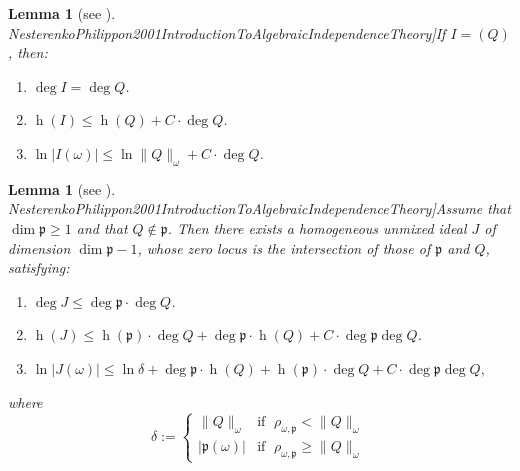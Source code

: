 \documentclass[reqno]{amsart}
\newcommand{\mycite}[2]{\cite[#1]{#2}}
\theoremstyle{plain}
\newtheorem{Lem}[Cor]{Lemma}
\theoremstyle{definition}
\theoremstyle{remark}
\theoremstyle{plain}
\begin{document}
\begin{Lem}[see \mycite{Chapter 3, Proposition 4.8}{NesterenkoPhilippon2001IntroductionToAlgebraicIndependenceTheory}]\label{Lemma Nesterenko principal ideal}
If $I=(Q)$, then:
\begin{enumerate}
 \item $\deg I=\deg Q$.
 \item $\operatorname{h}(I)\leq\operatorname{h}(Q)+C\cdot\deg Q$.
 \item $\ln|I(\omega)|\leq\ln\|Q\|_\omega+C\cdot\deg Q$.
\end{enumerate}
\end{Lem}

\begin{Lem}[see \mycite{Chapter 3, Proposition 4.11}{NesterenkoPhilippon2001IntroductionToAlgebraicIndependenceTheory}]\label{Lemma Nesterenko proposition intersection of ideal and polynomial}
Assume that $\dim\mathfrak p\geq 1$ and that $Q\not\in\mathfrak p$. Then there exists a homogeneous unmixed ideal $J$ of dimension $\dim\mathfrak p -1$, whose zero locus is the intersection of those of $\mathfrak p$ and $Q$, satisfying:
\begin{enumerate}
\item $\deg J\leq \deg\mathfrak p\cdot\deg Q$.
\item $\operatorname{h}(J)\leq\operatorname{h}(\mathfrak p)\cdot\deg Q+\deg\mathfrak p\cdot\operatorname{h}(Q)+C\cdot\deg\mathfrak p\deg Q$.
\item $
    \ln|J(\omega)|
        \leq
    \ln\delta+\deg\mathfrak p\cdot\operatorname{h}(Q)+\operatorname{h}(\mathfrak p)\cdot\deg Q+C\cdot\deg\mathfrak p\deg Q
,$
\end{enumerate}

where
\[
    \delta
        :=
\begin{cases}
    \|Q\|_\omega&\text{if }\;\rho_{\omega,\mathfrak p}<\|Q\|_\omega\\
    |\mathfrak p(\omega)|&\text{if }\;\rho_{\omega,\mathfrak p}\geq \|Q\|_\omega
\end{cases}
\]
\end{Lem}
\end{document}
